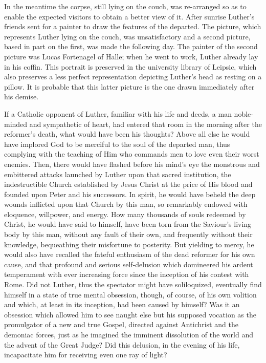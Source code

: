 In the meantime the corpse, still lying on the couch, was re-arranged
so as to enable the expected visitors to obtain a better view of it.
After sunrise Luther’s friends sent for a painter to draw the features
of the departed. The picture, which represents Luther lying on the
couch, was unsatisfactory and a second picture, based in part on the
first, was made the following day. The painter of the second picture
was Lucas Fortenagel of Halle; when he went to work, Luther already
lay in his coffin. This portrait is preserved in the university library of
Leipsic, which also preserves a less perfect representation depicting
Luther’s head as resting on a pillow. It is probable that this latter
picture is the one drawn immediately after his demise.

If a Catholic opponent of Luther, familiar with his life and deeds,
a man noble-minded and sympathetic of heart, had entered that room
in the morning after the reformer’s death, what would have been his
thoughts? Above all else he would have implored God to be merciful
to the soul of the departed man, thus complying with the teaching of
Him who commands men to love even their worst enemies. Then,
there would have flashed before his mind’s eye the monstrous and
embittered attacks launched by Luther upon that sacred institution,
the indestructible Church established by Jesus Christ at the price of
His blood and founded upon Peter and his successors. In spirit, he
would have beheld the deep wounds inflicted upon that Church by
this man, so remarkably endowed with eloquence, willpower, and
energy. How many thousands of souls redeemed by Christ, he would
have said to himself, have been torn from the Saviour’s living body by
this man, without any fault of their own, and frequently without
their knowledge, bequeathing their misfortune to posterity. But yielding
to mercy, he would also have recalled the fateful enthusiasm of
the dead reformer for his own cause, and that profound and serious
self-delusion which domineered his ardent temperament with ever
increasing force since the inception of his contest with Rome. Did not
Luther, thus the spectator might have soliloquized, eventually find
himself in a state of true mental obsession, though, of course, of his
own volition and which, at least in its inception, had been caused by
himself? Was it an obsession which allowed him to see naught else but
his supposed vocation as the promulgator of a new and true Gospel,
directed against Antichrist and the demoniac forces, just as he imagined
the imminent dissolution of the world and the advent of the
Great Judge? Did this delusion, in the evening of his life, incapacitate
him for receiving even one ray of light?

